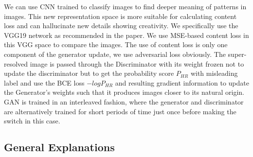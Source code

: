 \begin{enumerate}
    We can use CNN trained to classify images to find deeper meaning of patterns in images. This new representation space is more suitable for calculating content loss and can hallucinate new details showing creativity. We specifically use the VGG19 network as recommended in the paper. We use MSE-based content loss in this VGG space to compare the images. The use of content loss is only one component of the generator update, we use adversarial loss obviously. The super-resolved image is passed through the Discriminator with its weight frozen not to update the discriminator but to get the probability score $P_{HR}$ with misleading label and use the BCE loss $-logP_{HR}$ and resulting gradient information to update the Generator’s weights such that it produces images closer to its natural origin.
    GAN is trained in an interleaved fashion, where the generator and discriminator are alternatively trained for short periods of time just once before making the switch in this case.

    \subsection{General Explanations}
    \end{enumerate}
